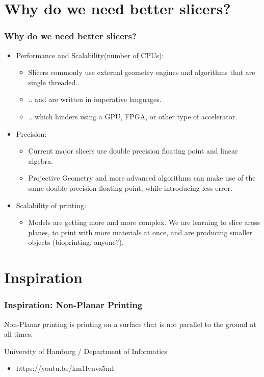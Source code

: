 \documentclass[hyperref={pdfpagemode=FullScreen},aspectratio=169]{beamer}
\begin{document}
\section{Why do we need better slicers?}

\begin{frame}
  \frametitle{Why do we need better slicers?}
  \begin{itemize}
  \item Performance and Scalability(number of CPUs):
    \begin{itemize}
    \item Slicers commonly use external geometry engines and algorithms that are single threaded..
    \item .. and are written in imperative languages.
    \item .. which hinders using a GPU, FPGA, or other type of accelerator.
    \end{itemize}
  \item Precision:
    \begin{itemize}
    \item Current major slicers use double precision floating point and linear algebra.
    \item Projective Geometry and more advanced algorithms can make use of the same double precision floating point, while introducing less error.
    \end{itemize}
  \item Scalability of printing:
    \begin{itemize}
    \item Models are getting more and more complex. We are learning to slice aross planes, to print with more materials at once, and are producing smaller objects (bioprinting, anyone?).
    \end{itemize}
  \end{itemize}
\end{frame}

\section{Inspiration}
\begin{frame}
  \frametitle{Inspiration: Non-Planar Printing}
  Non-Planar printing is printing on a surface that is not parallel to the ground at all times.
  \begin{block}{University of Hamburg / Department of Informatics}
    \begin{itemize}
    \item https://youtu.be/km1lvuva5mI
    \end{itemize}
  \end{block}
\end{frame}
\end{document}
